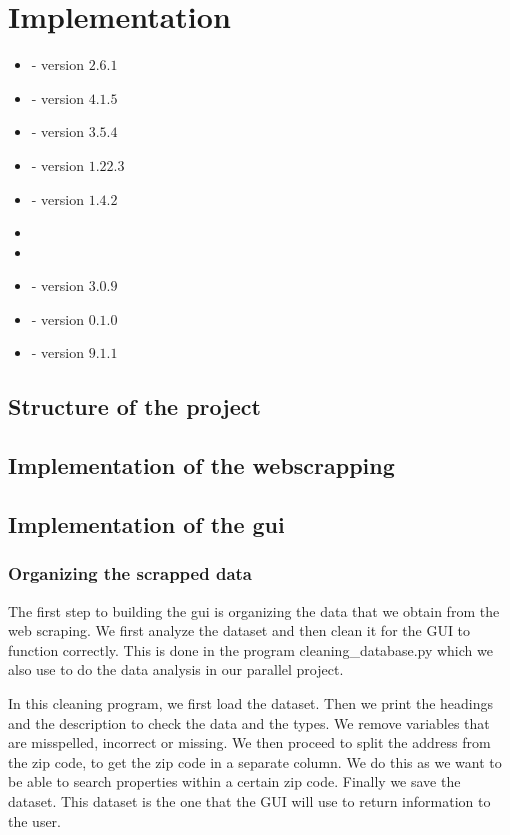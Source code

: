 \documentclass[main]{subfiles}
\begin{document}
\section{Implementation}
\begin{itemize}
    \item \pkg[Scrapy] -  version $2.6.1$
    \item \pkg[Selenium] - version $4.1.5$
    \item {} - version $3.5.4$
    \item \pkg[Numpy] -  version $1.22.3$
    \item \pkg[Pandas]  - version $1.4.2$
    \item \pkg[Time]
    \item \pkg[Datetime]
    \item \pkg[Openpyxl] - version $3.0.9$
    \item \pkg[Tk (tkinter)] - version $0.1.0$
    \item \pkg[Pillow] - version $9.1.1$
\end{itemize}

\subsection{Structure of the project}

\subsection{Implementation of the webscrapping}

\subsection{Implementation of the \ac{gui}}

\subsubsection{Organizing the scrapped data}
The first step to building the \ac{gui} is organizing the data that we obtain from the web scraping.
We first analyze the dataset and then clean it for the GUI to function correctly.
This is done in the program cleaning\_database.py which we also use to do the data analysis in our parallel project. \par
In this cleaning program, we first load the dataset. 
Then we print the headings and the description to check the data and the types.
We remove variables that are misspelled, incorrect or missing. 
We then proceed to split the address from the zip code, to get the zip code in a separate column. 
We do this as we want to be able to search properties within a certain zip code. 
Finally we save the dataset. This dataset is the one that the GUI will use to return information to the user.
\end{document}
